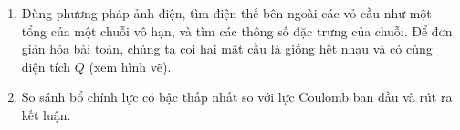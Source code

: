 \begin{vd}
\begin{center}
\end{center}
\begin{enumerate}[1)]
  \item Dùng phương pháp ảnh điện, tìm điện thế bên ngoài các vỏ cầu như một tổng của một chuỗi vô hạn, và tìm các thông số đặc trưng của chuỗi. Để đơn giản hóa bài toán, chúng ta coi hai mặt cầu là giống hệt nhau và có cùng điện tích $Q$ (xem hình vẽ).
  \item So sánh bổ chính lực có bậc thấp nhất so với lực Coulomb ban đầu và rút ra kết luận.
 \end{enumerate}
  \end{vd}
  
